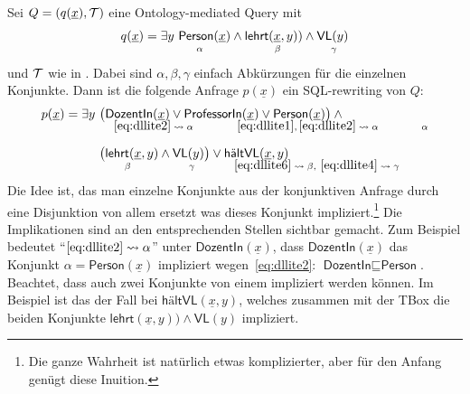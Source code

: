\documentclass[fontsize=11pt, twoside=false, numbers=autoenddot]{scrbook}
\begin{document}
Sei $Q=(q(\underline x),\mathcal{T})$ eine Ontology-mediated Query mit
%
\begin{align*}
  q(\underline x)=\exists y~&\textsf{Person}(\underline x)\wedge
  \textsf{lehrt}(\underline x,y))\wedge\textsf{VL}(y) \\[-2mm]
  & \hspace{5mm}{\scriptstyle\alpha\hspace{20mm}\beta\hspace{14mm}\gamma}
\end{align*}
%
und $\mathcal{T}$ wie in \textsf{\hyperlink{BspDLLite}{\BspDLLite}}. 
Dabei sind $\alpha,\beta,\gamma$
einfach Abkürzungen für die einzelnen Konjunkte.  Dann ist die
folgende Anfrage $p(\underline x)$ ein SQL-rewriting von $Q$:
%
\begin{align*}
  p(\underline x) = \exists y~&\big(\textsf{DozentIn}(\underline x)\vee
  \textsf{ProfessorIn}(\underline x)\vee \textsf{Person}(\underline
  x)\big) \wedge{}\\[-2mm]
  &
  \hspace{4mm}{\scriptstyle\eqref{eq:dllite2}\;\rightsquigarrow\;\alpha} \hspace{11mm}{\scriptstyle\eqref{eq:dllite1},\,\eqref{eq:dllite2}\;\rightsquigarrow\;\alpha}
  \hspace{12mm}{\scriptstyle\alpha}\\[2mm]
%
& \big(\textsf{lehrt}(\underline x,y)\wedge \textsf{VL}(y)\big)\vee
\textsf{hältVL}(\underline x,y)\\[-2mm]
%
  & \hspace{7mm}\scriptstyle{\beta} \hspace{15mm}\scriptstyle{\gamma}
  \hspace{11mm}\scriptstyle{\eqref{eq:dllite6}\;\rightsquigarrow\;
  \beta,~\eqref{eq:dllite4}\;\rightsquigarrow\;\gamma}
\end{align*}
%
Die Idee ist, das man einzelne Konjunkte aus der konjunktiven Anfrage
durch eine Disjunktion von allem ersetzt was dieses Konjunkt
impliziert.\footnote{Die ganze Wahrheit ist natürlich etwas
komplizierter, aber für den Anfang genügt diese Inuition.}
 Die Implikationen sind an den entsprechenden Stellen
sichtbar gemacht. Zum Beispiel bedeutet
``$\eqref{eq:dllite2}\rightsquigarrow\alpha$'' unter
$\textsf{DozentIn}(\underline x)$, dass $\textsf{DozentIn}(\underline x)$
das Konjunkt $\alpha=\textsf{Person}(\underline x)$ impliziert
wegen~\eqref{eq:dllite2}: $\textsf{DozentIn}\sqsubseteq
\textsf{Person}$. Beachtet, dass auch zwei Konjunkte 
von einem impliziert werden können. Im Beispiel ist das der Fall bei
$\textsf{hältVL}(\underline x,y)$, welches zusammen mit der TBox die
beiden Konjunkte $\textsf{lehrt}(\underline x,y))\wedge\textsf{VL}(y)$ impliziert. 
\end{document}
